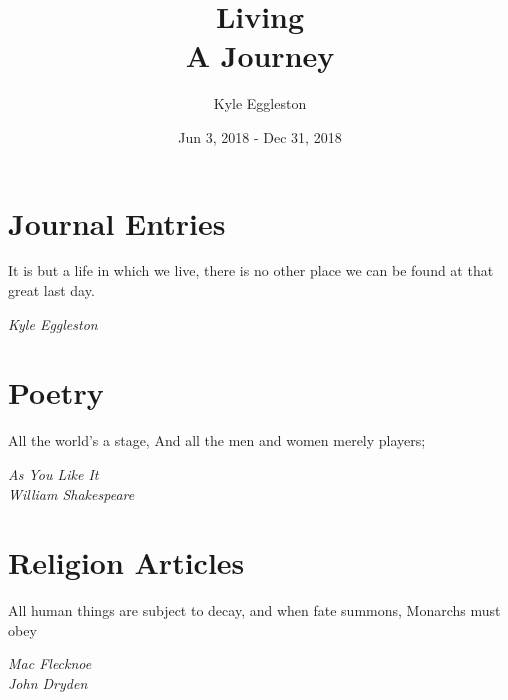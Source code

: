\documentclass{book}
\title{%
  Living \\
  \large A Journey}
\author{Kyle Eggleston}
\date{Jun 3, 2018 - Dec 31, 2018}
\begin{document}
\maketitle
\thispagestyle{empty}

\frontmatter

\tableofcontents

\listoffigures

\newpage



\mainmatter

\chapter{Journal Entries}
\epigraph{It is but a life in which we live, there is no other place we can be
found at that great last day.}{\textit{Kyle Eggleston}}




















\chapter{Poetry}
\epigraph{All the world’s a stage, And all the men and women merely players;}
{\textit{As You Like It \\ William Shakespeare}}





\chapter{Religion Articles}
\epigraph{All human things are subject to decay, and when fate 
summons, Monarchs must obey}{\textit{Mac Flecknoe \\ John Dryden}}











\newpage

\appendix




\backmatter
\printbibliography
\end{document}
